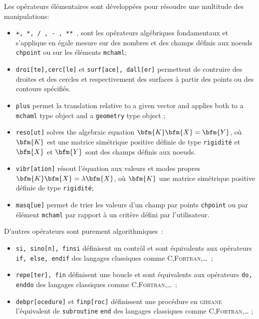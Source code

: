 Les opérateurs élémentaires sont développées pour résoudre une multitude des 
manipulations:
\begin{itemize}

\item \texttt{+, *, / , - , ** }, sont les opérateurs algébriques 
fondamentaux et s'applique en égale mesure sur des nombres et des 
champs définis aux noeuds \texttt{chpoint} ou sur les éléments 
\texttt{mchaml};

\item \texttt{droi[te],cerc[le]} et  \texttt{surf[ace], dall[er]} permettent de 
contruire des droites et des cercles et respectivement des surfaces à partir 
des points ou des contours spécifiés. 

\item \texttt{plus} permet la translation relative to a given vector and
applies both to a \texttt{mchaml} type object and a \texttt{geometry} type object ;

\item \texttt{reso[ut]} solves the algebraic equation $\bfm{K} \bfm{X} = \bfm{Y}$, où $\bfm{K}$ est 
une matrice simétrique positive définie de type \texttt{rigidité} et $\bfm{X}$ et $\bfm{Y}$ sont 
des champs définis aux noeuds. 
 
\item \texttt{vibr[ation]} résout l'équation aux valeurs et modes propres $\bfm{K} \bfm{X} = \lambda \bfm{X}$, 
où $\bfm{K}$  une matrice simétrique positive définie de type \texttt{rigidité};

\item \texttt{masq[ue]} permet de trier les valeurs d'un champ par points \texttt{chpoint} ou par 
élément \texttt{mchaml} par rapport à un critère défini par l'utilisateur.

\end{itemize}
D'autres opérateurs sont purement algorithmiques~: 
\begin{itemize}

\item \texttt{si, sino[n], finsi} définisent un contrôl et sont équivalents aux opérateurs \texttt{if,
else, endif} des langages classiques comme \textsc{C,Fortran,\ldots}~;

\item \texttt{repe[ter], fin} définisent une boucle et sont équivalents aux opérateurs \texttt{do,
enddo} des langages classiques comme \textsc{C,Fortran,\ldots}~;

\item \texttt{debpr[ocedure]} et \texttt{finp[roc]} définissent une procédure en 
\textsc{gibiane} l'équivalent de \texttt{subroutine} 
\texttt{end} des langages classiques comme \textsc{C,Fortran,\ldots}  ;

\end{itemize}
